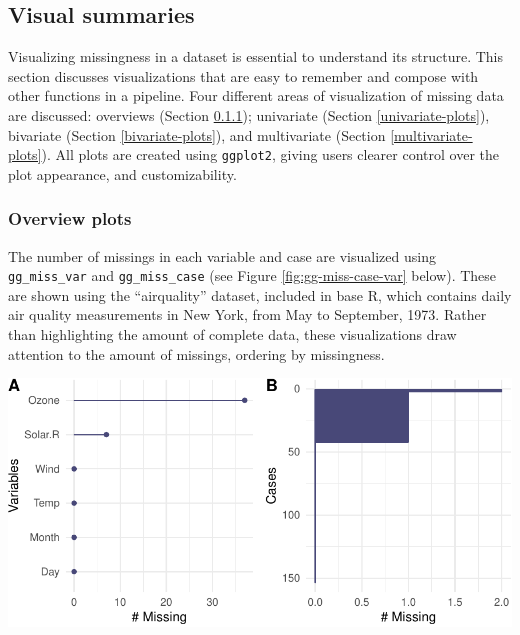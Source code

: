 \documentclass[]{article}
\let\origfigure\figure
\let\endorigfigure\endfigure
\renewenvironment{figure}[1][2] {
    \expandafter\origfigure\expandafter[H]
} {
    \endorigfigure
}
\theoremstyle{definition}
\theoremstyle{definition}
\theoremstyle{definition}
\theoremstyle{remark}
\begin{document}
\hypertarget{vis-summaries}{%
\subsection{Visual summaries}\label{vis-summaries}}

Visualizing missingness in a dataset is essential to understand its
structure. This section discusses visualizations that are easy to
remember and compose with other functions in a pipeline. Four different
areas of visualization of missing data are discussed: overviews (Section
\ref{overview-plots}); univariate (Section \ref{univariate-plots}),
bivariate (Section \ref{bivariate-plots}), and multivariate (Section
\ref{multivariate-plots}). All plots are created using \texttt{ggplot2},
giving users clearer control over the plot appearance, and
customizability.

\hypertarget{overview-plots}{%
\subsubsection{Overview plots}\label{overview-plots}}

The number of missings in each variable and case are visualized using
\texttt{gg\_miss\_var} and \texttt{gg\_miss\_case} (see Figure
\ref{fig:gg-miss-case-var} below). These are shown using the
``airquality'' dataset, included in base R, which contains daily air
quality measurements in New York, from May to September, 1973. Rather
than highlighting the amount of complete data, these visualizations draw
attention to the amount of missings, ordering by missingness.

\begin{figure}

{\centering \includegraphics[width=0.9\linewidth]{tidy-missing-data-paper_files/figure-latex/gg-miss-case-var-1} 

}

\caption{Graphical summaries of missingness in variables and cases for the airquality data. (A) Missings in each variable and (B) in each case. There are missing values in Ozone and Solar.R, with Ozone having more missings, and not many cases have two missing values, with most missingness being from cases with one missing value.}\label{fig:gg-miss-case-var}
\end{figure}
\end{document}
